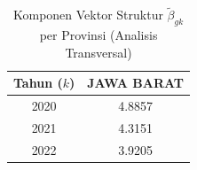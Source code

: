\begin{table}[H]
\centering
\small
\caption{Komponen Vektor Struktur $\tilde{\beta}_{gk}$ per Provinsi (Analisis Transversal)} \label{tab:sample2beta_provinsi}
\begin{tabular}{|c|c|}
\hline
\textbf{Tahun ($k$)} & \textbf{JAWA BARAT} \\
\hline
2020 & 4.8857 \\
2021 & 4.3151 \\
2022 & 3.9205 \\
\hline
\end{tabular}
\end{table}